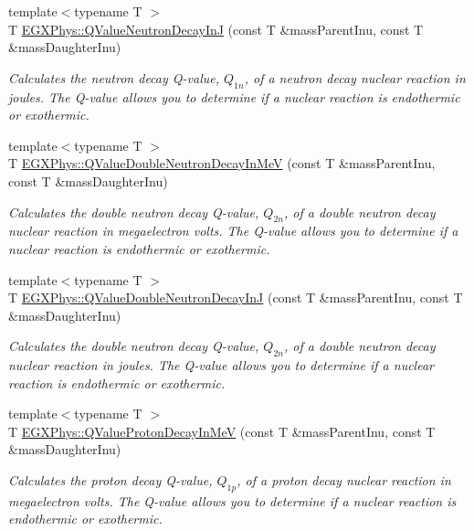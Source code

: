 \begin{DoxyCompactItemize}
{\footnotesize template$<$typename T $>$ }\\T \hyperlink{group___e_g_x_phys-_q_value_gab9ffbd12c3f814e03f0ed1fbdcba0700}{E\+G\+X\+Phys\+::\+Q\+Value\+Neutron\+Decay\+InJ} (const T \&mass\+Parent\+Inu, const T \&mass\+Daughter\+Inu)
\begin{DoxyCompactList}\small\item\em Calculates the neutron decay Q-\/value, $Q_{1n}$, of a neutron decay nuclear reaction in joules. The Q-\/value allows you to determine if a nuclear reaction is endothermic or exothermic. \end{DoxyCompactList}\item 
{\footnotesize template$<$typename T $>$ }\\T \hyperlink{group___e_g_x_phys-_q_value_ga6bfea723aca78b32ea67cc1ca7b4031b}{E\+G\+X\+Phys\+::\+Q\+Value\+Double\+Neutron\+Decay\+In\+MeV} (const T \&mass\+Parent\+Inu, const T \&mass\+Daughter\+Inu)
\begin{DoxyCompactList}\small\item\em Calculates the double neutron decay Q-\/value, $Q_{2n}$, of a double neutron decay nuclear reaction in megaelectron volts. The Q-\/value allows you to determine if a nuclear reaction is endothermic or exothermic. \end{DoxyCompactList}\item 
{\footnotesize template$<$typename T $>$ }\\T \hyperlink{group___e_g_x_phys-_q_value_gada1ace2aa0a791df382f120767a56fe9}{E\+G\+X\+Phys\+::\+Q\+Value\+Double\+Neutron\+Decay\+InJ} (const T \&mass\+Parent\+Inu, const T \&mass\+Daughter\+Inu)
\begin{DoxyCompactList}\small\item\em Calculates the double neutron decay Q-\/value, $Q_{2n}$, of a double neutron decay nuclear reaction in joules. The Q-\/value allows you to determine if a nuclear reaction is endothermic or exothermic. \end{DoxyCompactList}\item 
{\footnotesize template$<$typename T $>$ }\\T \hyperlink{group___e_g_x_phys-_q_value_ga514354518df3bf1cde561b6d75879ef0}{E\+G\+X\+Phys\+::\+Q\+Value\+Proton\+Decay\+In\+MeV} (const T \&mass\+Parent\+Inu, const T \&mass\+Daughter\+Inu)
\begin{DoxyCompactList}\small\item\em Calculates the proton decay Q-\/value, $Q_{1p}$, of a proton decay nuclear reaction in megaelectron volts. The Q-\/value allows you to determine if a nuclear reaction is endothermic or exothermic. \end{DoxyCompactList}\item 

\end{DoxyCompactItemize}
